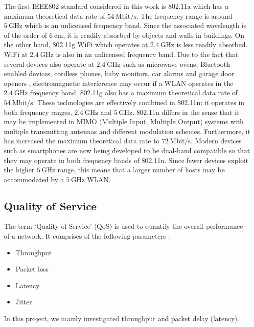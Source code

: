 The first \gls{IEEE802} standard considered in this work is 802.11a which has a maximum theoretical data rate of $54~\textrm{Mbit/s}$. The frequency range is around $5~\mathrm{GHz}$ \cite{banerji2013ieee} which is an unlicensed frequency band. Since the associated wavelength is of the order of $6~\mathrm{cm}$, it is readily absorbed by objects and walls in buildings. On the other hand, 802.11g \gls{WiFi} which operates at $2.4~\mathrm{GHz}$ is less readily absorbed. \gls{WiFi} at $2.4~\mathrm{GHz}$  is also in an unlicensed frequency band. Due to the fact that several devices also operate at $2.4~\mathrm{GHz}$ such as microwave ovens, Bluetooth-enabled devices, cordless phones, baby monitors, car alarms and garage door openers \cite{lifewire}, electromagnetic interference may occur if a \gls{WLAN} operates in the $2.4~\mathrm{GHz}$ frequency band. 802.11g also has a maximum theoretical data rate of $54~\textrm{Mbit/s}$. \cite{banerji2013ieee} These technologies are effectively combined in 802.11n: it operates in both frequency ranges, $2.4~\mathrm{GHz}$ and $5~\mathrm{GHz}$. 802.11n differs in the sense that it may be implemented in \gls{MIMO} (Multiple Input, Multiple Output) systems with multiple transmitting antennas and different modulation schemes. \cite{banerji2013ieee} Furthermore, it has increased the maximum theoretical data rate to $72~\mathrm{Mbit/s}$. Modern devices such as smartphones are now being developed to be dual-band compatible so that they may operate in both frequency bands of 802.11n. Since fewer devices exploit the higher $5~\mathrm{GHz}$ range, this means that a larger number of hosts may be accommodated by a $5~\mathrm{GHz}$ \gls{WLAN}.

\subsection{Quality of Service} \label{subsec:background:qos}
The term `Quality of Service' (\gls{QoS}) is used to quantify the overall performance of a network. It comprises of the following parameters \cite{qos}:
\begin{itemize}
	\item Throughput 
	\item Packet loss
	\item Latency
	\item Jitter
\end{itemize}

In this project, we mainly investigated throughput and packet delay (latency).

